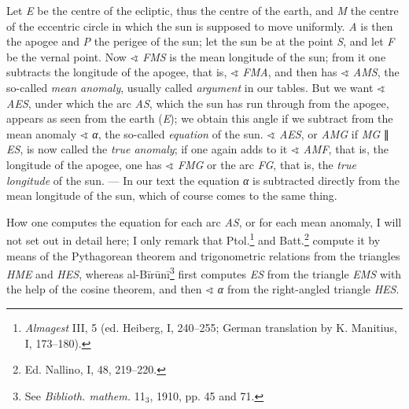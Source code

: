 \documentclass[11pt]{article}
\begin{document}
\par Let \emph{E} be the centre of the ecliptic, thus the centre of the earth, and \emph{M} the centre of the eccentric circle in which the sun is supposed to move uniformly. \emph{A} is then the apogee and \emph{P} the perigee of the sun; let the sun be at the point \emph{S}, and let \emph{F} be the vernal point. Now {\SignFont\upshape ∢} \emph{FMS} is the mean longitude of the sun; from it one subtracts the longitude of the apogee, that is, {\SignFont\upshape ∢} \emph{FMA}, and then has {\SignFont\upshape ∢} \emph{AMS}, the so-called \emph{mean anomaly}, usually called \emph{argument} in our tables. But we want {\SignFont\upshape ∢} \emph{AES}, under which the arc \emph{AS}, which the sun has run through from the apogee, appears as seen from the earth (\emph{E}); we obtain this angle if we subtract from the mean anomaly {\SignFont\upshape ∢} \emph{{\greekfont α}}, the so-called \emph{equation} of the sun. {\SignFont\upshape ∢} \emph{AES}, or \emph{AMG} if \emph{MG} {\SignFont\upshape ∥} \emph{ES}, is now called the \emph{true anomaly}; if one again adds to it {\SignFont\upshape ∢} \emph{AMF}, that is, the longitude of the apogee, one has {\SignFont\upshape ∢} \emph{FMG} or the arc \emph{FG}, that is, the \emph{true longitude} of the sun. — In our text the equation \emph{{\greekfont α}} is subtracted directly from the mean longitude of the sun, which of course comes to the same thing.\par
\par How one computes the equation for each arc \emph{AS}, or for each mean anomaly, I will not set out in detail here; I only remark that Ptol.\footnote{\emph{Almagest} III, 5 (ed. Heiberg, I, 240–255; German translation by K. Manitius, I, 173–180).} and Batt.\footnote{Ed. Nallino, I, 48, 219–220.} compute it by means of the Pythagorean theorem and trigonometric relations from the triangles \emph{HME} and \emph{HES}, whereas al-Bīrūnī\footnote{See \emph{Biblioth. mathem.} 11$_{3}$, 1910, pp. 45 and 71.} first computes \emph{ES} from the triangle \emph{EMS} with the help of the cosine theorem, and then {\SignFont\upshape ∢} \emph{{\greekfont α}} from the right-angled triangle \emph{HES}.\par
\end{document}
